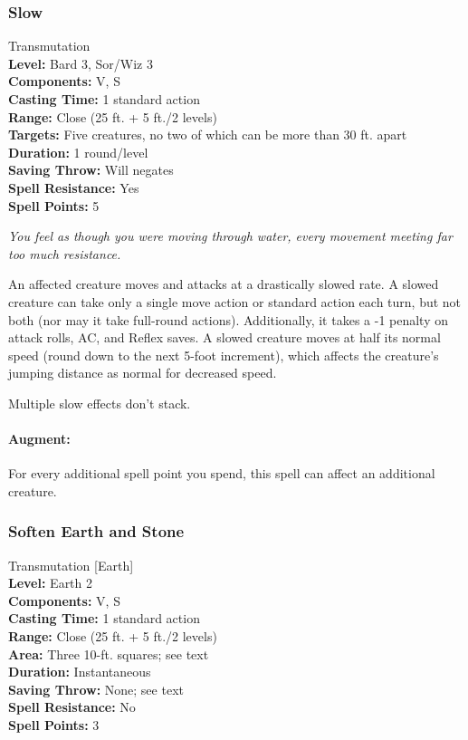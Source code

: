 \subsubsection{Slow}
\label{Spell:Slow}
Transmutation
\\ \textbf{Level:} Bard 3, Sor/Wiz 3
\\ \textbf{Components:} V, S
\\ \textbf{Casting Time:} 1 standard action
\\ \textbf{Range:} Close (25 ft. + 5 ft./2 levels)
\\ \textbf{Targets:} Five creatures, no two of which can be more than 30 ft. apart
\\ \textbf{Duration:} 1 round/level
\\ \textbf{Saving Throw:} Will negates
\\ \textbf{Spell Resistance:} Yes
\\ \textbf{Spell Points:} 5

\emph{You feel as though you were moving through water, every movement meeting far too much resistance.}

An affected creature moves and attacks at a drastically slowed rate. 
A slowed creature can take only a single move action or standard action each turn, 
but not both (nor may it take full-round actions). 
Additionally, it takes a -1 penalty on attack rolls, AC, and Reflex saves. 
A slowed creature moves at half its normal speed (round down to the next 5-foot increment), 
which affects the creature's jumping distance as normal for decreased speed.

Multiple slow effects don't stack.

\paragraph{Augment:} For every additional spell point you spend, this spell can affect an additional creature.

\subsubsection{Soften Earth and Stone}
\label{Spell:SoftenEarthAndStone}
Transmutation [Earth]
\\ \textbf{Level:} Earth 2
\\ \textbf{Components:} V, S
\\ \textbf{Casting Time:} 1 standard action
\\ \textbf{Range:} Close (25 ft. + 5 ft./2 levels)
\\ \textbf{Area:} Three 10-ft. squares; see text
\\ \textbf{Duration:} Instantaneous
\\ \textbf{Saving Throw:} None; see text
\\ \textbf{Spell Resistance:} No
\\ \textbf{Spell Points:} 3


